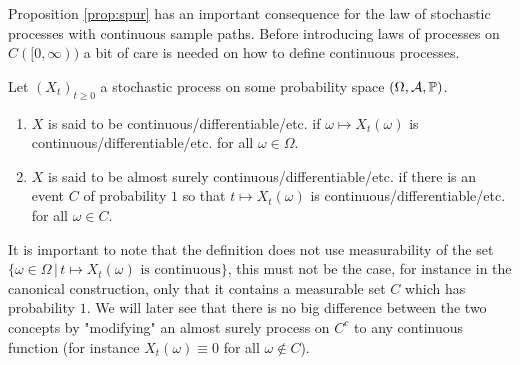 Proposition \ref{prop:spur} has an important consequence for the law of stochastic processes with continuous sample paths. Before introducing laws of processes on $C([0,\infty))$ a bit of care is needed on how to define continuous processes.
\begin{ldef}
	\begin{deff}\label{def:claw}
		Let $(X_t)_{t\geq 0}$ a stochastic process on some probability space $(\Omega, \mathcal A, \P)$.
		\begin{enumerate}[label=(\roman*)]
			\item $X$ is said to be continuous/differentiable/etc. if $\omega\mapsto X_t(\omega)$ is continuous/differentiable/etc. for all $\omega\in \Omega$.
   			\item $X$ is said to be almost surely continuous/differentiable/etc. if	there is an event $C$ of probability $1$ so that $t\mapsto X_t(\omega)$ is continuous/differentiable/etc. for all $\omega \in C$.
		\end{enumerate}
	\end{deff}
\end{ldef}
It is important to note that the definition does not use measurability of the set $\{\omega\in \Omega\,|\, t\mapsto X_t(\omega)\text{ is continuous}\}$, this must not be the case, for instance in the canonical construction, only that it contains a measurable set $C$ which has probability $1$. We will later see that there is no big difference between the two concepts by "modifying"{} an almost surely process on $C^c$ to any continuous function (for instance $X_t(\omega)\equiv 0$ for all $\omega\notin C$).  \smallskip

